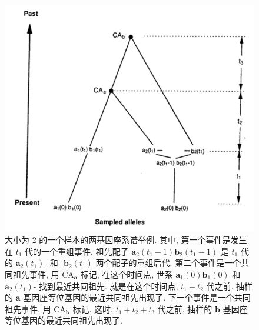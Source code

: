 \documentclass[12pt]{article}
\begin{document}
\begin{figure}
    \centering
    \includegraphics{coalescent-process.images/image3.png}
    \caption{
        大小为 2 的一个样本的两基因座系谱举例. 其中, 第一个事件是发生在 $t_{1}$ 代的一个重组事件, 祖先配子
        $\mathbf{a}_{2}(t_{1}-1)\mathbf{b}_{2}(t_{1}-1)$ 是 $t_{1}$ 代的 $\mathbf{a}_{2}(t_{1})\text{-}$ 和
        $\text{-}\mathbf{b}_{2}(t_{1})$ 两个配子的重组后代. 第二个事件是一个共同祖先事件, 用 $\text{CA}_{\mathbf{a}}$
        标记, 在这个时间点, 世系 $\mathbf{a}_{1}(0)\mathbf{b}_{1}(0)$ 和 $\mathbf{a}_{2}(t_{1})\text{-}$
        找到最近共同祖先. 就是在这个时间点, $t_{1}+t_{2}$ 代之前. 抽样的 $\mathbf{a}$ 基因座等位基因的最近共同祖先出现了.
        下一个事件是一个共同祖先事件, 用 $\text{CA}_{\mathbf{b}}$ 标记. 这时, $t_{1}+t_{2}+t_{3}$ 代之前, 抽样的
        $\mathbf{b}$ 基因座等位基因的最近共同祖先出现了.
    }
    \label{fig:3}
\end{figure}
\end{document}
